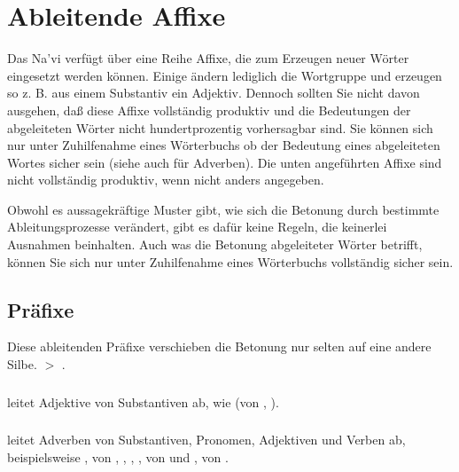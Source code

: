 
\section{Ableitende Affixe}
\noindent Das Na'vi verf\"ugt \"uber eine Reihe Affixe, die zum Erzeugen neuer
W\"orter eingesetzt werden k\"onnen. Einige \"andern lediglich die Wortgruppe und
erzeugen so z. B. aus einem Substantiv ein Adjektiv. Dennoch sollten Sie nicht
davon ausgehen, da\ss{} diese Affixe vollst\"andig produktiv und die Bedeutungen
der abgeleiteten W\"orter nicht hundertprozentig vorhersagbar sind.\label{lingop:affixes}
Sie k\"onnen sich nur unter Zuhilfenahme eines W\"orterbuchs ob der Bedeutung eines
abgeleiteten Wortes sicher sein (siehe auch  f\"ur Adverben).
Die unten angef\"uhrten Affixe sind nicht vollst\"andig produktiv, wenn nicht anders
angegeben.

\medskip
\noindent Obwohl es aussagekr\"aftige Muster gibt, wie sich die Betonung durch
bestimmte Ableitungsprozesse ver\"andert, gibt es daf\"ur keine Regeln, die
keinerlei Ausnahmen beinhalten. Auch was die Betonung abgeleiteter W\"orter betrifft,
k\"onnen Sie sich nur unter Zuhilfenahme eines W\"orterbuchs vollst\"andig sicher sein.


\subsection{Pr\"afixe} Diese ableitenden Pr\"afixe verschieben die Betonung nur
selten auf eine andere Silbe.  $>$ .

\subsubsection{}  leitet Adjektive von Substantiven ab, wie
  (von , ).

\subsubsection{}  leitet Adverben von Substantiven, Pronomen, Adjektiven und
Verben ab, beispielsweise ,  von
, , , ,  von
  und ,  von 
.

